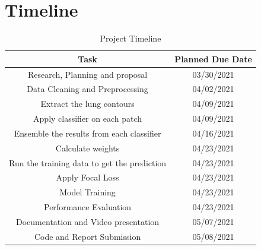 \documentclass{sigkddExp}
\begin{document}
\section{Timeline}

\begin{table}[H]
    \centering
    \caption{Project Timeline}
    \begin{tabular}{|c|c|} \hline
        Task                                        & Planned Due Date \\ \hline
        Research, Planning and proposal             & 03/30/2021       \\ \hline
        Data Cleaning and Preprocessing             & 04/02/2021       \\ \hline
        Extract the lung contours                   & 04/09/2021       \\ \hline
        Apply classifier on each patch              & 04/09/2021       \\ \hline
        Ensemble the results from each classifier   & 04/16/2021       \\ \hline
        Calculate weights                           & 04/23/2021       \\ \hline
        Run the training data to get the prediction & 04/23/2021       \\ \hline
        Apply Focal Loss                            & 04/23/2021       \\ \hline
        Model Training                              & 04/23/2021       \\ \hline
        Performance Evaluation                      & 04/23/2021       \\ \hline
        Documentation and Video presentation        & 05/07/2021       \\ \hline
        Code and Report Submission                  & 05/08/2021       \\
        \hline\end{tabular}
\end{table}


\newpage
%

\end{document}
